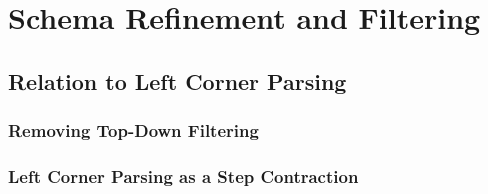 \chapter{Schema Refinement and Filtering}
\label{cha:Unify}

\section{Relation to Left Corner Parsing}
\subsection{Removing Top-Down Filtering}
\subsection{Left Corner Parsing as a Step Contraction}
